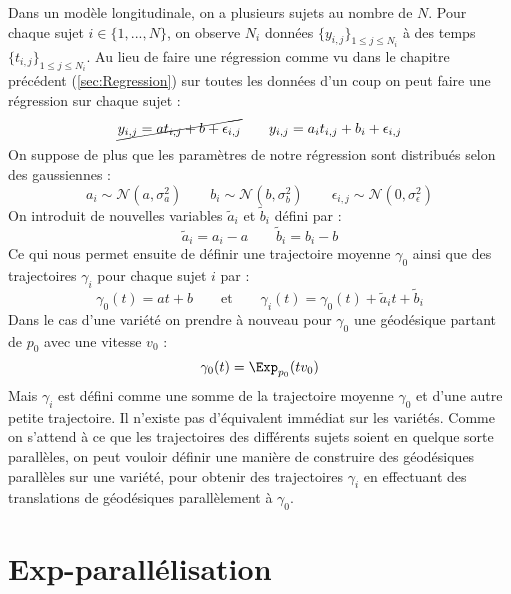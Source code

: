 Dans un modèle longitudinale, on a plusieurs sujets au nombre de $N$. Pour chaque sujet $i \in \{ 1, ..., N \}$, on observe $N_i$ données $\{ y_{i,j} \}_{1 \leqslant j \leqslant N_i}$ à des temps $\{ t_{i,j} \}_{1 \leqslant j \leqslant N_i}$. Au lieu de faire une régression comme vu dans le chapitre précédent (\ref{sec:Regression}) sur toutes les données d'un coup on peut faire une régression sur chaque sujet :
\begin{equation}
	\cancel{y_{i,j} = a t_{i,j} + b + \epsilon_{i,j}} \qquad y_{i,j} = a_i t_{i,j} + b_i + \epsilon_{i,j}
\end{equation}
On suppose de plus que les paramètres de notre régression sont distribués selon des gaussiennes :
\begin{equation}
	a_i \sim \mathcal{N}(a, \sigma_a^2) \qquad b_i \sim \mathcal{N}(b, \sigma_b^2) \qquad \epsilon_{i,j} \sim \mathcal{N}(0, \sigma_\epsilon^2)
\end{equation}
On introduit de nouvelles variables $\tilde{a}_i$ et $\tilde{b}_i$ défini par :
\begin{equation}
	\tilde{a}_i = a_i - a \qquad \tilde{b}_i = b_i - b
\end{equation}
Ce qui nous permet ensuite de définir une trajectoire moyenne $\gamma_0$ ainsi que des trajectoires $\gamma_i$ pour chaque sujet $i$ par :
\begin{equation}
	\gamma_0(t) = at + b \qquad \text{et} \qquad \gamma_i(t) = \gamma_0(t) + \tilde{a}_it + \tilde{b}_i
\end{equation}
Dans le cas d'une variété on prendre à nouveau pour $\gamma_0$ une géodésique partant de $p_0$ avec une vitesse $v_0$ :
\begin{equation}
	\gamma_0(t) = \Exp_{p_0}(t v_0)
\end{equation}
Mais $\gamma_i$ est défini comme une somme de la trajectoire moyenne $\gamma_0$ et d'une autre petite trajectoire. Il n'existe pas d'équivalent immédiat sur les variétés. Comme on s'attend à ce que les trajectoires des différents sujets soient en quelque sorte parallèles, on peut vouloir définir une manière de construire des géodésiques parallèles sur une variété, pour obtenir des trajectoires $\gamma_i$ en effectuant des translations de géodésiques parallèlement à $\gamma_0$.

\section{Exp-parallélisation}